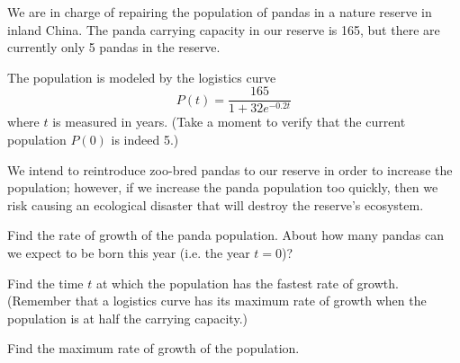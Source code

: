 \documentclass{letter}
\begin{document}
    We are in charge of repairing the population of pandas in a nature
    reserve in inland China.
    The panda carrying capacity in our reserve is 165, but there
    are currently only 5 pandas in the reserve.

    The population is modeled by the logistics curve
    \[
      P(t) = \frac{165}{1 + 32 e^{-0.2t}}
    \]
    where $t$ is measured in years. (Take a moment to verify that the
    current population $P(0)$ is indeed 5.)

    We intend to reintroduce zoo-bred pandas to our reserve in order
    to increase the population; however, if we
    increase the panda population too quickly, then we risk causing an
    ecological disaster that will destroy the reserve's ecosystem.

    \begin{problem}{}
      Find the rate of growth of the panda population.
      About how many pandas can we expect to be born this year
      (i.e. the year $t = 0$)?

    \end{problem}

    \begin{problem}{}
      Find the time $t$ at which the population has the fastest
      rate of growth.
      (Remember that a logistics curve has its maximum rate of growth
      when the population is at half the carrying capacity.)

    \end{problem}

    \begin{problem}{}
      Find the maximum rate of growth of the population.

    \end{problem}
\end{document}
